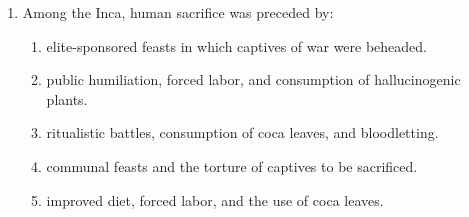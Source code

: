 \documentclass[12pt]{article}
\begin{document}
\begin{enumerate}[label=\arabic*.]
\begin{enumerate}[label=(\alph*)]
    \item Ming Dynasty Ceramic Art
    \item Qin manufacture
    \item Han Stoneware
    \item Lung-shan
    \item Hangzhou Style
\end{enumerate}
\item Among the Inca, human sacrifice was preceded by:
\begin{enumerate}[label=(\alph*)]
    \item elite-sponsored feasts in which captives of war were beheaded.
    \item public humiliation, forced labor, and consumption of hallucinogenic plants.
    \item ritualistic battles, consumption of coca leaves, and bloodletting.
    \item communal feasts and the torture of captives to be sacrificed.
    \item improved diet, forced labor, and the use of coca leaves.
\end{enumerate}
\end{enumerate}
\end{document}
